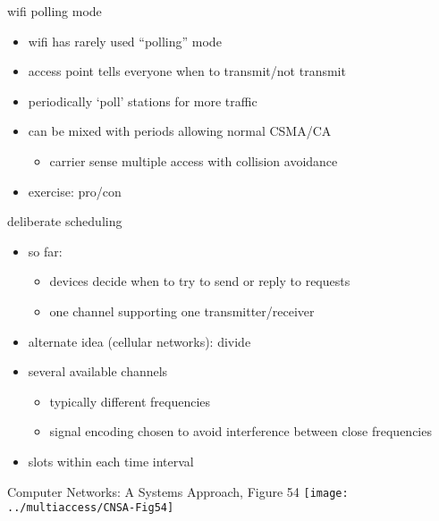 \begin{frame}{wifi polling mode}
    \begin{itemize}
    \item wifi has rarely used ``polling'' mode
    \vspace{.5cm}
    \item access point tells everyone when to transmit/not transmit
    \item periodically `poll' stations for more traffic
    \item can be mixed with periods allowing normal CSMA/CA
        \begin{itemize}
        \item carrier sense multiple access with collision avoidance
        \end{itemize}
    \vspace{.5cm}
    \item exercise: pro/con
    \end{itemize}
\end{frame}

\begin{frame}{deliberate scheduling}
\begin{itemize}
\item so far: 
    \begin{itemize}
    \item devices decide when to try to send or reply to requests
    \item one channel supporting one transmitter/receiver
    \end{itemize}
\vspace{.5cm}
\item alternate idea (cellular networks): divide
\item several available channels
    \begin{itemize}
    \item typically different frequencies
    \item signal encoding chosen to avoid interference between close frequencies
    \end{itemize}
\item slots within each time interval
\end{itemize}
\end{frame}

\begin{frame}

{\fontsize{9}{10}\selectfont Computer Networks: A Systems Approach, Figure 54}
\texttt{[image: ../multiaccess/CNSA-Fig54]}
\end{frame}

